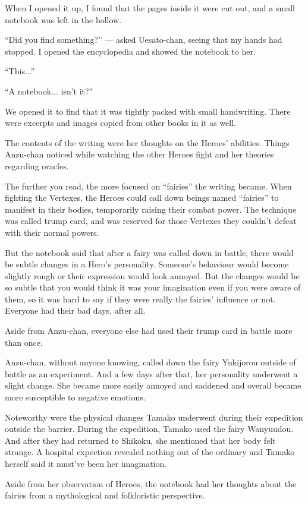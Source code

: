 When I opened it up, I found that the pages inside it were cut out, and a small notebook was left in the hollow.

``Did you find something?'' --- asked Uesato-chan, seeing that my hands had stopped. I opened the encyclopedia and showed the notebook to her.

``This...''

``A notebook... isn't it?''

We opened it to find that it was tightly packed with small handwriting. There were excerpts and images copied from other books in it as well.

The contents of the writing were her thoughts on the Heroes' abilities. Things Anzu-chan noticed while watching the other Heroes fight and her theories regarding oracles.

The further you read, the more focused on ``fairies'' the writing became. When fighting the Vertexes, the Heroes could call down beings named ``fairies'' to manifest in their bodies, temporarily raising their combat power. The technique was called trump card, and was reserved for those Vertexes they couldn't defeat with their normal powers.

But the notebook said that after a fairy was called down in battle, there would be subtle changes in a Hero's personality. Someone's behaviour would become slightly rough or their expression would look annoyed. But the changes would be so subtle that you would think it was your imagination even if you were aware of them, so it was hard to say if they were really the fairies' influence or not. Everyone had their bad days, after all.

Aside from Anzu-chan, everyone else had used their trump card in battle more than once.

Anzu-chan, without anyone knowing, called down the fairy Yukijorou outside of battle as an experiment. And a few days after that, her personality underwent a slight change. She became more easily annoyed and saddened and overall became more susceptible to negative emotions.

Noteworthy were the physical changes Tamako underwent during their expedition outside the barrier. During the expedition, Tamako used the fairy Wanyuudou. And after they had returned to Shikoku, she mentioned that her body felt strange. A hospital expection revealed nothing out of the ordinary and Tamako herself said it must've been her imagination.

Aside from her observation of Heroes, the notebook had her thoughts about the fairies from a mythological and folkloristic perspective.


